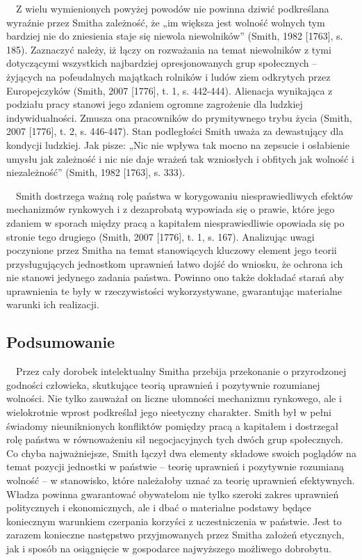 \documentclass[a4paper]{article}
\begin{document}
\ \ Z wielu wymienionych powyżej powodów nie powinna dziwić podkreślana wyraźnie przez Smitha zależność, że „im większa
jest wolność wolnych tym bardziej nie do zniesienia staje się niewola niewolników” \label{ref:RNDtOthMxkQwu}(Smith,
1982 [1763], s. 185). Zaznaczyć należy, iż łączy on rozważania na temat niewolników z tymi dotyczącymi wszystkich
najbardziej opresjonowanych grup społecznych – żyjących na pofeudalnych majątkach rolników i ludów ziem odkrytych przez
Europejczyków \label{ref:RND3sDYK8lMK4}(Smith, 2007 [1776], t. 1, s. 442-444). Alienacja wynikająca z podziału pracy
stanowi jego zdaniem ogromne zagrożenie dla ludzkiej indywidualności. Zmusza ona pracowników do prymitywnego trybu
życia \label{ref:RNDARpT9oVdt9}(Smith, 2007 [1776], t. 2, s. 446-447). Stan podległości Smith uważa za dewastujący dla
kondycji ludzkiej. Jak pisze: „Nic nie wpływa tak mocno na zepsucie i osłabienie umysłu jak zależność i nic nie daje
wrażeń tak wzniosłych i obfitych jak wolność i niezależność” \label{ref:RNDzgsq8IO3HU}(Smith, 1982 [1763], s. 333). 

 \ \ Smith dostrzega ważną rolę państwa w korygowaniu niesprawiedliwych efektów mechanizmów rynkowych i z dezaprobatą
wypowiada się o prawie, które jego zdaniem w sporach między pracą a kapitałem niesprawiedliwie opowiada się po stronie
tego drugiego \label{ref:RNDISiSQpgteG}(Smith, 2007 [1776], t. 1, s. 167). Analizując uwagi poczynione przez Smitha na
temat stanowiących kluczowy element jego teorii przysługujących jednostkom uprawnień łatwo dojść do wniosku, że ochrona
ich nie stanowi jedynego zadania państwa. Powinno ono także dokładać starań aby uprawnienia te były w rzeczywistości
wykorzystywane, gwarantując materialne warunki ich realizacji.

\subsection{Podsumowanie}
 \ \ Przez cały dorobek intelektualny Smitha przebija przekonanie o przyrodzonej godności człowieka, skutkujące teorią
uprawnień i pozytywnie rozumianej wolności. Nie tylko zauważał on liczne ułomności mechanizmu rynkowego, ale i
wielokrotnie wprost podkreślał jego nieetyczny charakter. Smith był w pełni świadomy nieuniknionych konfliktów pomiędzy
pracą a kapitałem i dostrzegał rolę państwa w równoważeniu sił negocjacyjnych tych dwóch grup społecznych. Co chyba
najważniejsze, Smith łączył dwa elementy składowe swoich poglądów na temat pozycji jednostki w państwie – teorię
uprawnień i pozytywnie rozumianą wolność – w stanowisko, które należałoby uznać za teorię uprawnień efektywnych. Władza
powinna gwarantować obywatelom nie tylko szeroki zakres uprawnień politycznych i ekonomicznych, ale i dbać o materialne
podstawy będące koniecznym warunkiem czerpania korzyści z uczestniczenia w państwie. Jest to zarazem konieczne
następstwo przyjmowanych przez Smitha założeń etycznych, jak i sposób na osiągnięcie w gospodarce najwyższego możliwego
dobrobytu.
\end{document}
